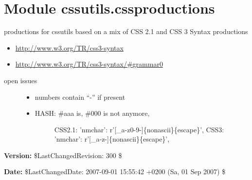 %
%
%


\section{Module cssutils.cssproductions}

    \label{cssutils:cssproductions}

productions for cssutils based on a mix of CSS 2.1 and CSS 3 Syntax
productions
\begin{itemize}
\item {} 
\href{http://www.w3.org/TR/css3-syntax}{http://www.w3.org/TR/css3-syntax}

\item {} 
\href{http://www.w3.org/TR/css3-syntax/\#grammar0}{http://www.w3.org/TR/css3-syntax/{\#}grammar0}

\end{itemize}
\begin{description}
\item[{open issues}] \leavevmode \begin{itemize}
\item {} 
numbers contain ``-'' if present

\item {} \begin{description}
\item[{HASH: {\#}aaa is, {\#}000 is not anymore,}] \leavevmode 
CSS2.1: 'nmchar': r'{[}{\_}a-z0-9-{]}{\textbar}{\{}nonascii{\}}{\textbar}{\{}escape{\}}',
CSS3: 'nmchar': r'{[}{\_}a-z-{]}{\textbar}{\{}nonascii{\}}{\textbar}{\{}escape{\}}',

\end{description}

\end{itemize}

\end{description}
\textbf{Version:} \$LastChangedRevision: 300 \$



\textbf{Date:} \$LastChangedDate: 2007-09-01 15:55:42 +0200 (Sa, 01 Sep 2007) \$



